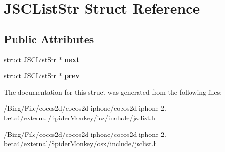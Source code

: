 \hypertarget{struct_j_s_c_list_str}{\section{J\-S\-C\-List\-Str Struct Reference}
\label{struct_j_s_c_list_str}
}
\subsection*{Public Attributes}
\begin{DoxyCompactItemize}
\item 
\hypertarget{struct_j_s_c_list_str_a81d299a90919c7e8f382617d5bda2fdb}{struct \hyperlink{struct_j_s_c_list_str}{J\-S\-C\-List\-Str} $\ast$ {\bfseries next}}\label{struct_j_s_c_list_str_a81d299a90919c7e8f382617d5bda2fdb}

\item 
\hypertarget{struct_j_s_c_list_str_a3ff4ad50e82e0d407a285a52dbbe1cd8}{struct \hyperlink{struct_j_s_c_list_str}{J\-S\-C\-List\-Str} $\ast$ {\bfseries prev}}\label{struct_j_s_c_list_str_a3ff4ad50e82e0d407a285a52dbbe1cd8}

\end{DoxyCompactItemize}


The documentation for this struct was generated from the following files\-:\begin{DoxyCompactItemize}
\item 
/\-Bing/\-File/cocos2d/cocos2d-\/iphone/cocos2d-\/iphone-\/2.-\/beta4/external/\-Spider\-Monkey/ios/include/jsclist.\-h\item 
/\-Bing/\-File/cocos2d/cocos2d-\/iphone/cocos2d-\/iphone-\/2.-\/beta4/external/\-Spider\-Monkey/osx/include/jsclist.\-h\end{DoxyCompactItemize}
